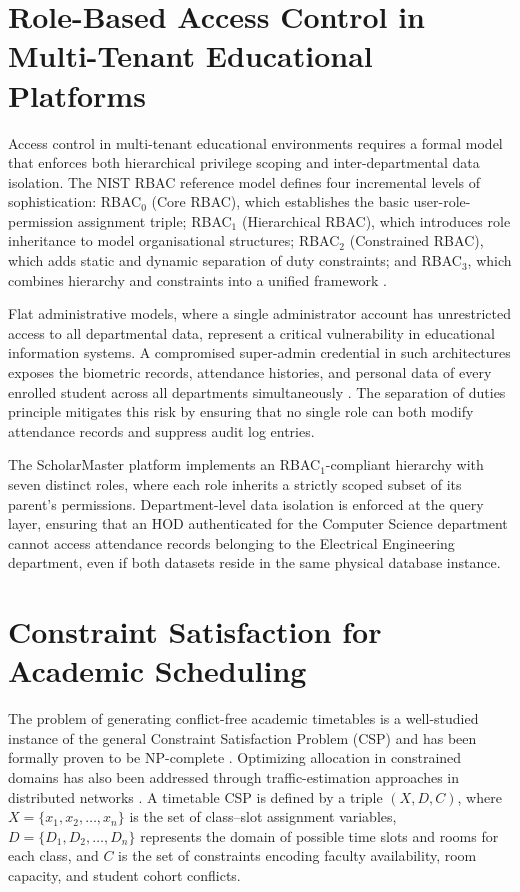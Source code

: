 \documentclass[12pt,a4paper,oneside]{report}
\begin{document}
\section{Role-Based Access Control in Multi-Tenant Educational Platforms}
Access control in multi-tenant educational environments requires a formal model that enforces both hierarchical privilege scoping and inter-departmental data isolation. The NIST RBAC reference model defines four incremental levels of sophistication: RBAC$_0$ (Core RBAC), which establishes the basic user-role-permission assignment triple; RBAC$_1$ (Hierarchical RBAC), which introduces role inheritance to model organisational structures; RBAC$_2$ (Constrained RBAC), which adds static and dynamic separation of duty constraints; and RBAC$_3$, which combines hierarchy and constraints into a unified framework \cite{sandhu1996rbac}.

Flat administrative models, where a single administrator account has unrestricted access to all departmental data, represent a critical vulnerability in educational information systems. A compromised super-admin credential in such architectures exposes the biometric records, attendance histories, and personal data of every enrolled student across all departments simultaneously \cite{saltzer1975protection, sabelfeld2003infoflow, denning1976lattice}. The separation of duties principle mitigates this risk by ensuring that no single role can both modify attendance records and suppress audit log entries.

The ScholarMaster platform implements an RBAC$_1$-compliant hierarchy with seven distinct roles, where each role inherits a strictly scoped subset of its parent's permissions. Department-level data isolation is enforced at the query layer, ensuring that an HOD authenticated for the Computer Science department cannot access attendance records belonging to the Electrical Engineering department, even if both datasets reside in the same physical database instance.

\section{Constraint Satisfaction for Academic Scheduling}
The problem of generating conflict-free academic timetables is a well-studied instance of the general Constraint Satisfaction Problem (CSP) and has been formally proven to be NP-complete \cite{spatiotemporal2018}. Optimizing allocation in constrained domains has also been addressed through traffic-estimation approaches in distributed networks \cite{b_smartgrid_2016}. A timetable CSP is defined by a triple $(X, D, C)$, where $X = \{x_1, x_2, \ldots, x_n\}$ is the set of class--slot assignment variables, $D = \{D_1, D_2, \ldots, D_n\}$ represents the domain of possible time slots and rooms for each class, and $C$ is the set of constraints encoding faculty availability, room capacity, and student cohort conflicts.
\end{document}
